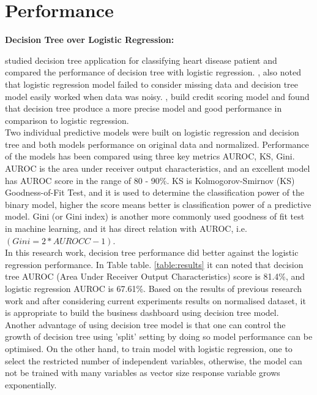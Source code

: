 \section{Performance}
\textbf{Decision Tree over Logistic Regression:}

\cite{long1993comparison} studied decision tree application for classifying heart disease patient and compared the performance of decision tree with logistic regression. \cite{long1993comparison}, also noted that logistic regression model failed to consider missing data and decision tree model easily worked when data was noisy. \cite{satchidananda2006comparing}, build credit scoring model and found that decision tree produce a more precise model and good performance in comparison to logistic regression.\\

Two individual predictive models were built on logistic regression and decision tree and both models performance on original data and normalized. Performance of the models has been compared using three key metrics AUROC, KS, Gini. AUROC is the area under receiver output characteristics, and an excellent model has AUROC score in the range of 80 - 90\%. KS is Kolmogorov-Smirnov (KS) Goodness-of-Fit Test, and it is used to determine the classification power of the binary model, higher the score means better is classification power of a predictive model. Gini (or Gini index) is another more commonly used goodness of fit test in machine learning, and it has direct relation with AUROC, i.e. $(Gini = 2*AUROCC - 1)$.\\

In this research work, decision tree performance did better against the logistic regression performance. In Table table. \ref{table:results} it can noted that decision tree AUROC (Area Under Receiver Output Characteristics) score is 81.4\%, and logistic regression AUROC is 67.61\%. Based on the results of previous research work and after considering current experiments results on normalised dataset, it is appropriate to build the business dashboard using decision tree model.\\

Another advantage of using decision tree model is that one can control the growth of decision tree using 'split' setting by doing so model performance can be optimised. On the other hand,  to train model with logistic regression, one to select the restricted number of independent variables, otherwise, the model can not be trained with many variables as vector size response variable grows exponentially.

